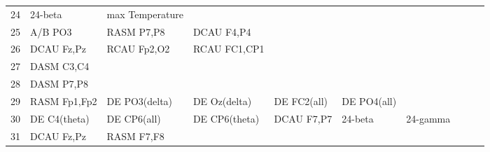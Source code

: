 \begin{landscape}
\begin{table}[]
\begin{tabular}{l|llllllll}
24       & 24-beta               & max Temperature       &                      &                         &                         &                      &                      &                       &                       &                    \\
25       & A/B PO3               & RASM P7,P8            & DCAU F4,P4           &                         &                         &                      &                      &                       &                       &                    \\
26       & DCAU Fz,Pz            & RCAU Fp2,O2           & RCAU FC1,CP1         &                         &                         &                      &                      &                       &                       &                    \\
27       & DASM C3,C4            &                       &                      &                         &                         &                      &                      &                       &                       &                    \\
28       & DASM P7,P8            &                       &                      &                         &                         &                      &                      &                       &                       &                    \\
29       & RASM Fp1,Fp2          & DE PO3(delta)         & DE Oz(delta)         & DE FC2(all)             & DE PO4(all)             &                      &                      &                       &                       &                    \\
30       & DE C4(theta)          & DE CP6(all)           & DE CP6(theta)        & DCAU F7,P7              & 24-beta                 & 24-gamma             &                      &                       &                       &                    \\
31       & DCAU Fz,Pz            & RASM F7,F8            &                      &                         &                         &                      &                      &                       &                       &                    \\
\end{tabular}
\end{table}
\end{landscape}
\clearpage
